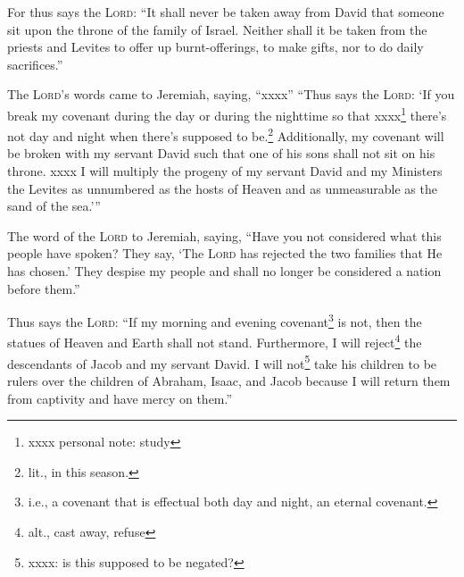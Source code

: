 \begin{inparaenum}
     For thus says the \textsc{Lord}: ``It shall never be taken away from David that someone sit upon the throne of the family of Israel.%
     Neither shall it be taken from the priests and Levites to offer up burnt-offerings, to make gifts, nor to do daily sacrifices.''%
    
     The \textsc{Lord}'s words came to Jeremiah, saying, ``xxxx''%
     ``Thus says the \textsc{Lord}: `If you break my covenant during the day or during the nighttime so that xxxx\footnote{xxxx personal note: study } there's not day and night when there's supposed to be.\footnote{lit., in this season.}%
     Additionally, my covenant will be broken with my servant David such that one of his sons shall not sit on his throne. xxxx%
     I will multiply the progeny of my servant David and my Ministers the Levites as unnumbered as the hosts of Heaven and as unmeasurable as the sand of the sea.'\thinspace''%
    
     The word of the \textsc{Lord} to Jeremiah, saying,%
     ``Have you not considered what this people have spoken? They say, `The \textsc{Lord} has rejected the two families that He has chosen.' They despise my people and shall no longer be considered a nation before them.''%
    
     Thus says the \textsc{Lord}: ``If my morning and evening covenant\footnote{i.e., a covenant that is effectual both day and night, an eternal covenant.} is not, then the statues of Heaven and Earth shall not stand.%
     Furthermore, I will reject\footnote{alt., cast away, refuse} the descendants of Jacob and my servant David. I will not\footnote{xxxx: is this supposed to be negated?} take his children to be rulers over the children of Abraham, Isaac, and Jacob because I will return them from captivity and have mercy on them.''%
\end{inparaenum}
